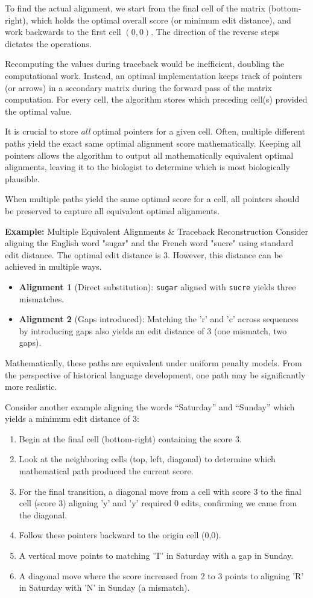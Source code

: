 To find the actual alignment, we start from the final cell of the matrix (bottom-right), which holds the optimal overall score (or minimum edit distance), and work backwards to the first cell $(0,0)$. The direction of the reverse steps dictates the operations.

Recomputing the values during traceback would be inefficient, doubling the computational work. Instead, an optimal implementation keeps track of pointers (or arrows) in a secondary matrix during the forward pass of the matrix computation. For every cell, the algorithm stores which preceding cell(s) provided the optimal value. 

\sta It is crucial to store \textit{all} optimal pointers for a given cell. Often, multiple different paths yield the exact same optimal alignment score mathematically. Keeping all pointers allows the algorithm to output all mathematically equivalent optimal alignments, leaving it to the biologist to determine which is most biologically plausible.

\sta When multiple paths yield the same optimal score for a cell, all pointers should be preserved to capture all equivalent optimal alignments. 

\textbf{Example:} Multiple Equivalent Alignments \& Traceback Reconstruction
Consider aligning the English word "sugar" and the French word "sucre" using standard edit distance. The optimal edit distance is 3. However, this distance can be achieved in multiple ways.
\begin{itemize}
    \item \textbf{Alignment 1} (Direct substitution): \texttt{sugar} aligned with \texttt{sucre} yields three mismatches.
    \item \textbf{Alignment 2} (Gaps introduced): Matching the 'r' and 'c' across sequences by introducing gaps also yields an edit distance of 3 (one mismatch, two gaps).
\end{itemize}
Mathematically, these paths are equivalent under uniform penalty models. From the perspective of historical language development, one path may be significantly more realistic. 

Consider another example aligning the words ``Saturday'' and ``Sunday'' which yields a minimum edit distance of 3:
\begin{enumerate}
    \item Begin at the final cell (bottom-right) containing the score 3.
    \item Look at the neighboring cells (top, left, diagonal) to determine which mathematical path produced the current score.
    \item For the final transition, a diagonal move from a cell with score 3 to the final cell (score 3) aligning 'y' and 'y' required 0 edits, confirming we came from the diagonal.
    \item Follow these pointers backward to the origin cell (0,0).
    \item A vertical move points to matching 'T' in Saturday with a gap in Sunday.
    \item A diagonal move where the score increased from 2 to 3 points to aligning 'R' in Saturday with 'N' in Sunday (a mismatch).
\end{enumerate}

